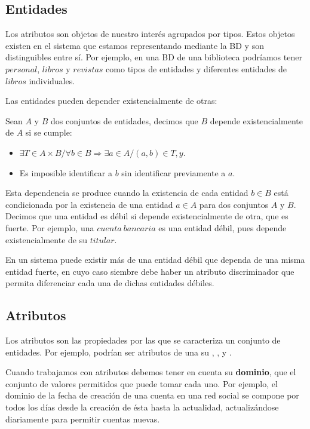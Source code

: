 \subsection{Entidades}

Los atributos son objetos de nuestro interés agrupados por tipos.
Estos objetos existen en el sistema que estamos representando mediante la BD y son distinguibles entre sí.
Por ejemplo, en una BD de una biblioteca podríamos tener $personal$, $libros$ y $revistas$ como tipos de entidades y diferentes entidades de $libros$ individuales.

Las entidades pueden depender existencialmente de otras:

\begin{displayquote}
Sean $A$ y $B$ dos conjuntos de entidades, decimos que $B$ depende existencialmente de $A$ si se cumple:

\begin{itemize}
	\item$\exists T\in A\times B/\forall b\in B \Rightarrow\exists a\in A/(a,b)\in T,y$.
	\item Es imposible identificar a $b$ sin identificar previamente a $a$.
\end{itemize}
\end{displayquote}

Esta dependencia se produce cuando la existencia de cada entidad $b\in B$ está condicionada por la existencia de una entidad $a\in A$ para dos conjuntos $A$ y $B$.
Decimos que una entidad es débil si depende existencialmente de otra, que es fuerte.
Por ejemplo, una $cuenta\ bancaria$ es una entidad débil, pues depende existencialmente de su $titular$.

En un sistema puede existir más de una entidad débil que dependa de una misma entidad fuerte, en cuyo caso siembre debe haber un atributo discriminador que permita diferenciar cada una de dichas entidades débiles.

\subsection{Atributos}

Los atributos son las propiedades por las que se caracteriza un conjunto de entidades.
Por ejemplo, podrían ser atributos de una  su , ,  y .

Cuando trabajamos con atributos debemos tener en cuenta su \textbf{dominio}, que el conjunto de valores permitidos que puede tomar cada uno.
Por ejemplo, el dominio de la fecha de creación de una cuenta en una red social se compone por todos los días desde la creación de ésta hasta la actualidad, actualizándose diariamente para permitir cuentas nuevas.

